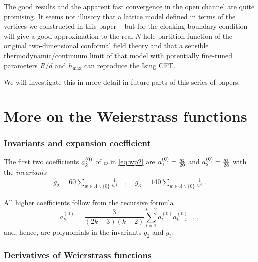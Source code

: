 \documentclass[11pt,a4paper]{article}
\numberwithin{equation}{section}
\begin{document}
The good results and the apparent fast convergence in the open channel are quite promising. It seems not illusory that a lattice model defined in terms of the vertices we constructed in this paper -- but for the cloaking boundary condition -- will give a good approximation to the real $N$-hole partition function of the original two-dimensional conformal field theory and that a sensible thermodynamic/continuum limit of that model with potentially fine-tuned parameters $R/d$ and $h_\mathrm{max}$ can reproduce the Ising CFT. 

We will investigate this in more detail in future parts of this series of papers.

\newpage
\appendix

\section{More on the Weierstrass functions}\label{app:Weierstr}

\subsubsection*{Invariants and expansion coefficient}

The first two coefficients $a_k^{\small(0)}$ of $\wp$ in \eqref{eq:wp2} are $a_1^{\small(0)} = \frac{g_2}{20}$ and $a_2^{\small(0)}=\frac{g_3}{28}$ \cite[Eq.\,18.5.2]{Abramowitz:1970} with the \textit{invariants} \cite[Eq.\,18.1.1]{Abramowitz:1970}
%
\begin{align}
    g_2 = 60 \sum_{w\in \Lambda\backslash\{0\}} \frac{1}{w^4}
    \quad , \quad
    g_3 = 140 \sum_{w\in \Lambda\backslash\{0\}} \frac{1}{w^6}\,.
\end{align}

\noindent
All higher coefficients follow from the recursive formula \cite[Eq.\,18.5.3]{Abramowitz:1970}
%
\begin{equation}
    a_k^{(0)} = \frac{3}{(2k+3)(k-2)}\sum\limits_{l=1}^{k-2} a_{l}^{(0)}a_{k-l-1}^{(0)}\,,
\end{equation}
%
and, hence, are polynomials in the invariants $g_2$ and $g_3$.

\subsubsection*{Derivatives of Weierstrass functions}
\end{document}
